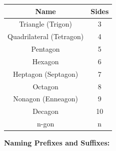\documentclass{article}
\begin{document}
            \begin{center}
                \begin{tabular}{|c|c|}
                    \hline
                    \textbf{Name} & \textbf{Sides} \\
                    \hline
                    Triangle (Trigon) & 3 \\
                    \hline
                    Quadrilateral (Tetragon) & 4 \\
                    \hline
                    Pentagon & 5 \\
                    \hline
                    Hexagon & 6 \\
                    \hline
                    Heptagon (Septagon) & 7 \\
                    \hline
                    Octagon & 8 \\
                    \hline
                    Nonagon (Enneagon) & 9 \\
                    \hline
                    Decagon & 10 \\
                    \hline
                    n-gon & n \\
                    \hline
                \end{tabular}
            \end{center}

            \noindent \color{purple} \textbf{Naming Prefixes and Suffixes: } \color{black} \\
\end{document}
